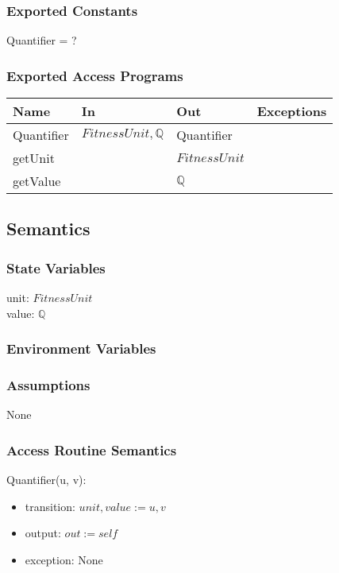 \documentclass[12pt, titlepage]{article}
\begin{document}
\subsubsection{Exported Constants}
Quantifier = ?
\subsubsection{Exported Access Programs}

\begin{center}
	\begin{tabular}{p{2cm} p{4cm} p{4cm} p{2cm}}
		\hline
		\textbf{Name} & \textbf{In} & \textbf{Out} & \textbf{Exceptions} \\
		\hline
		Quantifier & $FitnessUnit, \mathbb{Q}$ & Quantifier &  \\
		getUnit &  & $FitnessUnit$ &  \\
		getValue &  & $\mathbb{Q}$ &  \\
		\hline
	\end{tabular}
\end{center}

\subsection{Semantics}

\subsubsection{State Variables}
unit: $FitnessUnit$ \\
value: $\mathbb{Q}$

\subsubsection{Environment Variables}

\subsubsection{Assumptions}
None

\subsubsection{Access Routine Semantics}

Quantifier(u, v):
\begin{itemize}
	\item transition: $unit, value := u, v$
	\item output: $out := self$
	\item exception: None
\end{itemize}
\end{document}
